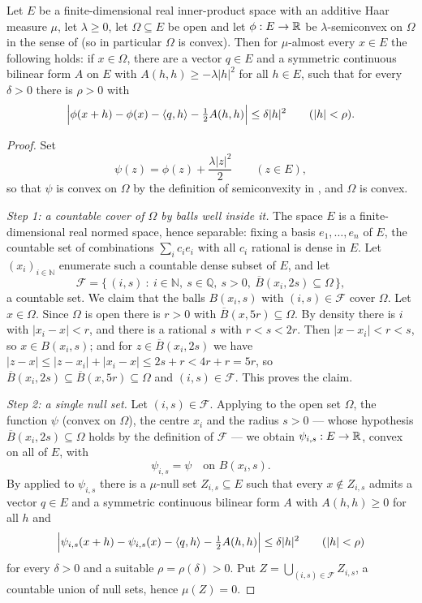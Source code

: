 \begin{theorem}
Let $E$ be a finite-dimensional real inner-product space with an additive Haar
measure $\mu$, let $\lambda\ge0$, let $\Omega\subseteq E$ be open and let
$\phi:E\to\mathbb{R}$ be $\lambda$-semiconvex on $\Omega$ in the sense of
 (so in particular $\Omega$ is convex). Then for
$\mu$-almost every $x\in E$ the following holds: if $x\in\Omega$, there are a
vector $q\in E$ and a symmetric continuous bilinear form $A$ on $E$ with
$A(h,h)\ge-\lambda|h|^2$ for all $h\in E$, such that for every $\delta>0$ there
is $\rho>0$ with
\[
  \Bigl|\phi(x+h)-\phi(x)-\langle q,h\rangle-\tfrac12A(h,h)\Bigr|
    \le\delta|h|^2\qquad(|h|<\rho).
\]
\end{theorem}
\begin{proof}
Set
\[
  \psi(z)=\phi(z)+\frac{\lambda|z|^2}{2}\qquad(z\in E),
\]
so that $\psi$ is convex on $\Omega$ by the definition of semiconvexity in
, and $\Omega$ is convex.

\emph{Step 1: a countable cover of $\Omega$ by balls well inside it.}
The space $E$ is a finite-dimensional real normed space, hence separable: fixing
a basis $e_1,\dots,e_n$ of $E$, the countable set of combinations
$\sum_i c_ie_i$ with all $c_i$ rational is dense in $E$. Let
$(x_i)_{i\in\mathbb N}$ enumerate such a countable dense subset of $E$, and let
\[
  \mathcal F=\bigl\{\,(i,s)\ :\ i\in\mathbb N,\ s\in\mathbb Q,\ s>0,\
     \overline B(x_i,2s)\subseteq\Omega\,\bigr\},
\]
a countable set. We claim that the balls $B(x_i,s)$ with $(i,s)\in\mathcal F$
cover $\Omega$. Let $x\in\Omega$. Since $\Omega$ is open there is $r>0$ with
$\overline B(x,5r)\subseteq\Omega$. By density there is $i$ with
$|x_i-x|<r$, and there is a rational $s$ with $r<s<2r$. Then
$|x-x_i|<r<s$, so $x\in B(x_i,s)$; and for $z\in\overline B(x_i,2s)$ we have
$|z-x|\le|z-x_i|+|x_i-x|\le2s+r<4r+r=5r$, so
$\overline B(x_i,2s)\subseteq\overline B(x,5r)\subseteq\Omega$ and
$(i,s)\in\mathcal F$. This proves the claim.

\emph{Step 2: a single null set.}
Let $(i,s)\in\mathcal F$. Applying  to the open set
$\Omega$, the function $\psi$ (convex on $\Omega$), the centre $x_i$ and the
radius $s>0$ --- whose hypothesis $\overline B(x_i,2s)\subseteq\Omega$ holds by
the definition of $\mathcal F$ --- we obtain $\psi_{i,s}:E\to\mathbb{R}$, convex on all
of $E$, with
\begin{equation}\label{eq:ssa-agree}
  \psi_{i,s}=\psi\quad\text{on }B(x_i,s).
\end{equation}
By  applied to $\psi_{i,s}$ there is a $\mu$-null
set $Z_{i,s}\subseteq E$ such that every $x\notin Z_{i,s}$ admits a vector
$q\in E$ and a symmetric continuous bilinear form $A$ with $A(h,h)\ge0$ for all
$h$ and
\begin{equation}\label{eq:ssa-exp}
  \Bigl|\psi_{i,s}(x+h)-\psi_{i,s}(x)-\langle q,h\rangle-\tfrac12A(h,h)\Bigr|
   \le\delta|h|^2\qquad(|h|<\rho)
\end{equation}
for every $\delta>0$ and a suitable $\rho=\rho(\delta)>0$. Put
$Z=\bigcup_{(i,s)\in\mathcal F}Z_{i,s}$, a countable union of null sets, hence
$\mu(Z)=0$.


\end{proof}
